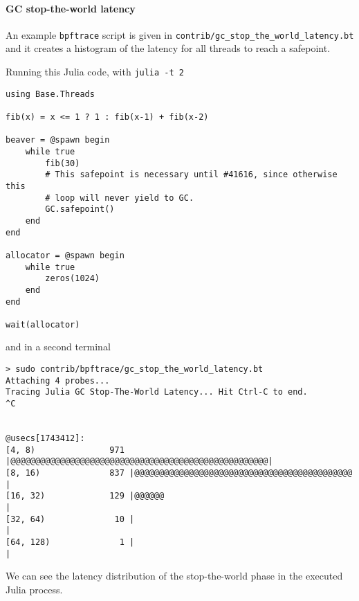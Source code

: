 \hypertarget{2953811662478296787}{}


\paragraph{GC stop-the-world latency}



An example \texttt{bpftrace} script is given in \texttt{contrib/gc\_stop\_the\_world\_latency.bt} and it creates a histogram of the latency for all threads to reach a safepoint.



Running this Julia code, with \texttt{julia -t 2}




\begin{lstlisting}
using Base.Threads

fib(x) = x <= 1 ? 1 : fib(x-1) + fib(x-2)

beaver = @spawn begin
    while true
        fib(30)
        # This safepoint is necessary until #41616, since otherwise this
        # loop will never yield to GC.
        GC.safepoint()
    end
end

allocator = @spawn begin
    while true
        zeros(1024)
    end
end

wait(allocator)
\end{lstlisting}



and in a second terminal




\begin{lstlisting}
> sudo contrib/bpftrace/gc_stop_the_world_latency.bt
Attaching 4 probes...
Tracing Julia GC Stop-The-World Latency... Hit Ctrl-C to end.
^C


@usecs[1743412]:
[4, 8)               971 |@@@@@@@@@@@@@@@@@@@@@@@@@@@@@@@@@@@@@@@@@@@@@@@@@@@@|
[8, 16)              837 |@@@@@@@@@@@@@@@@@@@@@@@@@@@@@@@@@@@@@@@@@@@@        |
[16, 32)             129 |@@@@@@                                              |
[32, 64)              10 |                                                    |
[64, 128)              1 |                                                    |
\end{lstlisting}



We can see the latency distribution of the stop-the-world phase in the executed Julia process.



\hypertarget{8894559035613839694}{}



